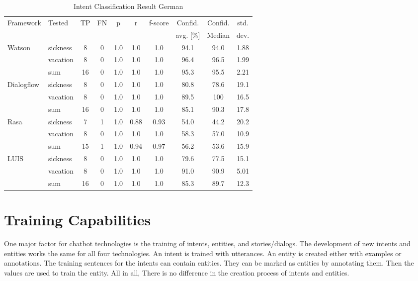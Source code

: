 \begin{table}[h]
    \centering
    \begin{tabular}{ l | l | c | c | c | c | c | c | c | c }
        \multirow{2}{*}{Framework} & \multirow{2}{*}{Tested} & \multirow{2}{*}{TP} & \multirow{2}{*}{FN} & \multirow{2}{*}{p} & \multirow{2}{*}{r} & \multirow{2}{*}{f-score} & Confid. & Confid. & std.\\ 
                 &&          &            &   & & & avg. [\%] & Median & dev.  \\ \hline \hline
        \multirow{3}{*}{Watson} 
        & sickness & 8 & 0& 1.0& 1.0& 1.0&94.1& 94.0& 1.88\\
        & vacation & 8 & 0& 1.0& 1.0& 1.0&96.4& 96.5&1.99\\
        & sum      &16 & 0& 1.0& 1.0& 1.0&95.3& 95.5&2.21 \\ \hline
        
        \multirow{3}{*}{Dialogflow} 
        & sickness & 8& 0& 1.0& 1.0& 1.0&80.8& 78.6&19.1\\
        & vacation & 8& 0& 1.0& 1.0& 1.0&89.5& 100& 16.5\\
        & sum      &16& 0& 1.0& 1.0& 1.0&85.1&90.3 &17.8\\ \hline

        \multirow{3}{*}{Rasa} 
        & sickness & 7& 1& 1.0& 0.88  & 0.93& 54.0& 44.2&20.2\\
        & vacation & 8& 0& 1.0& 1.0& 1.0& 58.3& 57.0&10.9\\
        & sum      &15& 1& 1.0& 0.94& 0.97& 56.2&53.6 &15.9\\ \hline

        \multirow{3}{*}{LUIS} 
        & sickness & 8& 0& 1.0& 1.0 & 1.0& 79.6& 77.5&15.1\\
        & vacation & 8& 0& 1.0& 1.0 & 1.0& 91.0& 90.9&5.01\\
        & sum      & 16&0& 1.0& 1.0 & 1.0& 85.3& 89.7&12.3\\
    \end{tabular}
    \caption{Intent Classification Result German} \label{tab:intent_classification_result_de}
\end{table} \noindent

\section*{Training Capabilities}
One major factor for chatbot technologies is the training of intents, entities, and stories/dialogs.
The development of new intents and entities works the same for all four technologies.
An intent is trained with utterances.
An entity is created either with examples or annotations.
The training sentences for the intents can contain entities.
They can be marked as entities by annotating them.
Then the values are used to train the entity.
All in all, There is no difference in the creation process of intents and entities.

